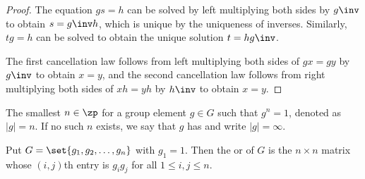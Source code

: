 \begin{proof}
    The equation $gs = h$ can be solved by left multiplying both sides by $g\inv$ to obtain $s = g\inv h$, which is unique by the uniqueness of inverses.
    Similarly, $tg = h$ can be solved to obtain the unique solution $t = hg\inv$.

    The first cancellation law follows from left multiplying both sides of $gx = gy$ by $g\inv$ to obtain $x = y$, and the second cancellation law follows from right multiplying both sides of $xh = yh$ by $h\inv$ to obtain $x = y$.
\end{proof}

 The smallest $n \in \zp$ for a group element $g \in G$ such that $g^n = 1$, denoted as $|g| = n$.
If no such $n$ exists, we say that $g$ has  and write $|g| = \infty$.

 Put $G = \set{g_1, g_2, \ldots, g_n}$ with $g_1 = 1$.
Then the  or  of $G$ is the $n \times n$ matrix whose $(i, j)$th entry is $g_i g_j$ for all $1 \leq i, j \leq n$.